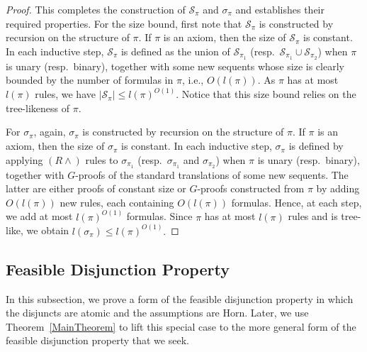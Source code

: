 \documentclass[12pt,a4paper]{article}
\theoremstyle{plain}
\theoremstyle{definition}
\begin{document}
\begin{proof}
This completes the construction of $\mathcal{S}_{\pi}$ and $\sigma_{\pi}$ and establishes their required properties. For the size bound, first note that $\mathcal{S}_{\pi}$ is constructed by recursion on the structure of $\pi$. If $\pi$ is an axiom, then the size of $\mathcal{S}_{\pi}$ is constant. In each inductive step, $\mathcal{S}_{\pi}$ is defined as the union of $\mathcal{S}_{\pi_1}$ (resp.\ $\mathcal{S}_{\pi_1}\cup\mathcal{S}_{\pi_2}$) when $\pi$ is unary (resp.\ binary), together with some new sequents whose size is clearly bounded by the number of formulas in $\pi$, i.e., $O(l(\pi))$. As $\pi$ has at most $l(\pi)$ rules, we have
$|\mathcal{S}_{\pi}|\leq l(\pi)^{O(1)}$.
Notice that this size bound relies on the tree-likeness of $\pi$.

For $\sigma_{\pi}$, again, $\sigma_{\pi}$ is constructed by recursion on the structure of $\pi$. If $\pi$ is an axiom, then the size of $\sigma_{\pi}$ is constant. In each inductive step, $\sigma_{\pi}$ is defined by applying $(R\wedge)$ rules to $\sigma_{\pi_1}$ (resp.\ $\sigma_{\pi_1}$ and $\sigma_{\pi_2}$) when $\pi$ is unary (resp.\ binary), together with $G$-proofs of the standard translations of some new sequents. The latter are either proofs of constant size or $G$-proofs constructed from $\pi$ by adding $O(l(\pi))$ new rules, each containing $O(l(\pi))$ formulas. Hence, at each step, we add at most $l(\pi)^{O(1)}$ formulas. Since $\pi$ has at most $l(\pi)$ rules and is tree-like, we obtain
$
l(\sigma_{\pi})\leq l(\pi)^{O(1)}.
$
\end{proof}

\subsection{Feasible Disjunction Property}

In this subsection, we prove a form of the feasible disjunction property in which the disjuncts are atomic and the assumptions are Horn. Later, we use Theorem~\ref{MainTheorem} to lift this special case to the more general form of the feasible disjunction property that we seek.
\end{document}
